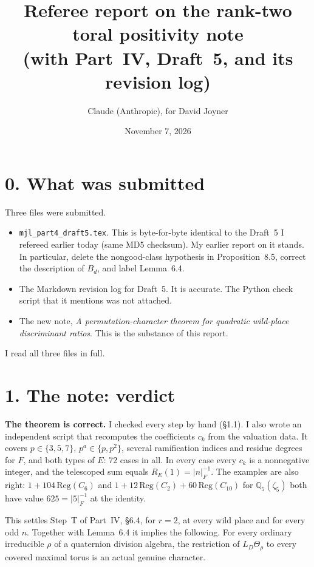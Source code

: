 \documentclass[11pt]{article}
\title{Referee report on the rank-two toral positivity note\\
\normalsize (with Part~IV, Draft~5, and its revision log)}
\author{Claude (Anthropic), for David Joyner}
\date{November 7, 2026}
\theoremstyle{plain}
\begin{document}
\maketitle

\section*{0. What was submitted}
Three files were submitted.
\begin{itemize}
\item \texttt{mjl\_part4\_draft5.tex}. This is byte-for-byte identical to
the Draft~5 I refereed earlier today (same MD5 checksum). My earlier
report on it stands. In particular, delete the nongood-class hypothesis
in Proposition~8.5, correct the description of $B_d$, and label
Lemma~6.4.
\item The Markdown revision log for Draft~5. It is accurate. The Python check script that it mentions was not attached.
\item The new note, \emph{A permutation-character theorem for quadratic
wild-place discriminant ratios}. This is the substance of this
report.
\end{itemize}
I read all three files in full.

\section*{1. The note: verdict}
\textbf{The theorem is correct.} I checked every step by hand (\S1.1).
I also wrote an independent script that recomputes the coefficients
$c_k$ from the valuation data. It covers $p\in\{3,5,7\}$, $p^a\in\{p,p^2\}$,
several ramification indices and residue degrees for $F$, and both
types of $E$: 72 cases in all. In every case every $c_k$ is a
nonnegative integer, and the telescoped sum equals
$R_E(1)=|n|_F^{-1}$. The examples are also right: $1+104\,\mathrm{Reg}(C_6)$
and $1+12\,\mathrm{Reg}(C_2)+60\,\mathrm{Reg}(C_{10})$ for
$\mathbb Q_5(\zeta_5)$ both have value $625=|5|_F^{-1}$ at the identity.

This settles Step~T of Part~IV, \S6.4, for $r=2$, at every wild place
and for every odd $n$. Together with Lemma~6.4 it implies the
following. For every ordinary irreducible $\rho$ of a quaternion
division algebra, the restriction of $L_D\Theta_\rho$ to every covered
maximal torus is an actual genuine character.
\end{document}
